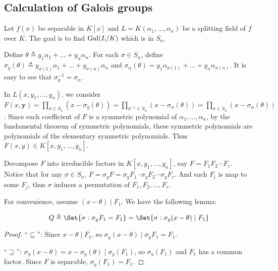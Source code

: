 \subsection{Calculation of Galois groups}
Let $f(x)$ be separable in $K[x]$ and $L = K(\alpha_1, \dots, \alpha_n)$ be a splitting field of
$f$ over $K$. The goal is to find $\operatorname{Gal}(L/K)$ which is in $S_n$.

Define $\theta \triangleq y_1 \alpha_1 + \dots + y_n \alpha_n$. For each $\sigma \in S_n$,
define $\sigma_y(\theta) \triangleq y_{\sigma(1)} \alpha_1 + \dots + y_{\sigma(n)} \alpha_n$ and
$\sigma_{\alpha}(\theta) = y_1 \alpha_{\sigma(1)} + \dots + y_n \alpha_{\sigma(n)}$.
It is easy to see that $\sigma_y^{-1} = \sigma_\alpha$. 

In $L(x, y_1, \dots, y_n)$, we consider $F(x, \bm{y})
= \prod\limits_{\sigma \in S_n} (x - \sigma_y(\theta))
= \prod\limits_{\sigma^{-1} \in S_n} (x - \sigma_{\alpha}(\theta))
= \prod\limits_{\sigma \in S_n} (x - \sigma_\alpha(\theta))$.
Since each coefficient of $F$ is a symmetric polynomial of $\alpha_1, \dots, \alpha_n$,
by the fundamental theorem of symmetric polynomials, these symmetric polynomials are
polynomials of the elementary symmetric polynomials. Thus $F(x, y) \in K[x, y_1, \dots, y_n]$.

Decompose $F$ into irreducible factors in $K[x, y_1, \dots, y_n]$, say $F = F_1 F_2 \dotsm F_r$.
Notice that for any $\sigma \in S_n$, $F = \sigma_y F = \sigma_y F_1 \cdot \sigma_y F_2 \dotsm \sigma_y F_r$.
And each $F_i$ is map to some $F_j$, thus $\sigma$ induces a permutation of $F_1, F_2, \dots, F_r$.

For convenience, assume $(x - \theta) \mid F_1$. We have the following lemma:

\begin{lemma}
  \[ Q \triangleq \Set{ \sigma : \sigma_y F_1 = F_1 } = \Set{ \sigma : \sigma_y(x - \theta) \mid F_1} \]
  \begin{proof}
    ``$\subseteq$'': Since $x - \theta \mid F_1$, so $\sigma_y (x - \theta) \mid \sigma_y F_1 = F_1$.

    ``$\supseteq$'': $\sigma_y(x - \theta) = x - \sigma_y(\theta) \mid \sigma_y(F_1)$, so $\sigma_y(F_1)$
    and $F_1$ has a common factor. Since $F$ is separable, $\sigma_y(F_1) = F_1$.
  \end{proof}
\end{lemma}

